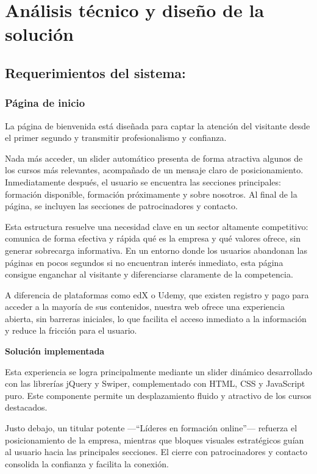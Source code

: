 \documentclass[11.5pt]{article}
\begin{document}
	\section{Análisis técnico y diseño de la solución}
	\subsection{Requerimientos del sistema:}
	
	\subsubsection{Página de inicio}
	
	La página de bienvenida está diseñada para captar la atención del visitante desde el primer segundo y transmitir profesionalismo y confianza.
	
	Nada más acceder, un slider automático presenta de forma atractiva algunos de los cursos más relevantes, acompañado de un mensaje claro de posicionamiento. Inmediatamente después, el usuario se encuentra las secciones principales: formación disponible, formación próximamente y sobre nosotros. Al final de la página, se incluyen las secciones de patrocinadores y contacto.
	
	Esta estructura resuelve una necesidad clave en un sector altamente competitivo: comunica de forma efectiva y rápida qué es la empresa y qué valores ofrece, sin generar sobrecarga informativa. En un entorno donde los usuarios abandonan las páginas en pocos segundos si no encuentran interés inmediato, esta página consigue enganchar al visitante y diferenciarse claramente de la competencia.
	
	A diferencia de plataformas como edX o Udemy, que existen registro y pago para acceder a la mayoría de sus contenidos, nuestra web ofrece una experiencia abierta, sin barreras iniciales, lo que facilita el acceso inmediato a la información y reduce la fricción para el usuario.
	
	\noindent\textbf{{\large Solución implementada}}
	
	Esta experiencia se logra principalmente mediante un slider dinámico desarrollado con las librerías jQuery y Swiper, complementado con HTML, CSS y JavaScript puro. Este componente permite un desplazamiento fluido y atractivo de los cursos destacados.
	
	Justo debajo, un titular potente —“Líderes en formación online”— refuerza el posicionamiento de la empresa, mientras que bloques visuales estratégicos guían al usuario hacia las principales secciones. El cierre con patrocinadores y contacto consolida la confianza y facilita la conexión.
	
\end{document}
